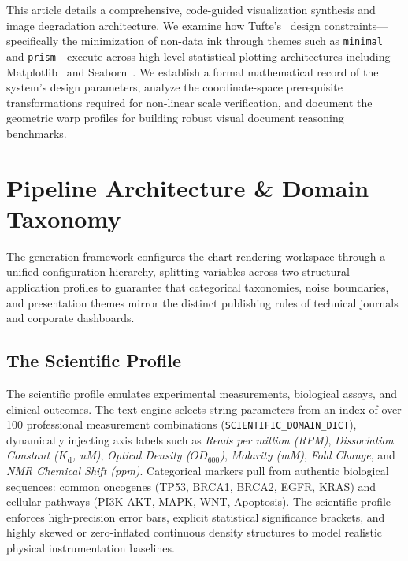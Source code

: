 \documentclass[11pt,twocolumn]{article}
\begin{document}
This article details a comprehensive, code-guided visualization synthesis and image degradation architecture.
We examine how Tufte's~\cite{tufte2001} design constraints---specifically the minimization of non-data ink through themes such as \texttt{minimal} and \texttt{prism}---execute across high-level statistical plotting architectures including Matplotlib~\cite{hunter2007matplotlib} and Seaborn~\cite{waskom2021seaborn}.
We establish a formal mathematical record of the system's design parameters, analyze the coordinate-space prerequisite transformations required for non-linear scale verification, and document the geometric warp profiles for building robust visual document reasoning benchmarks.

\section{Pipeline Architecture \& Domain Taxonomy}\label{sec:architecture}

The generation framework configures the chart rendering workspace through a unified configuration hierarchy, splitting variables across two structural application profiles to guarantee that categorical taxonomies, noise boundaries, and presentation themes mirror the distinct publishing rules of technical journals and corporate dashboards.

\subsection{The Scientific Profile}\label{sec:scientific}

The scientific profile emulates experimental measurements, biological assays, and clinical outcomes.
The text engine selects string parameters from an index of over 100 professional measurement combinations (\texttt{SCIENTIFIC\_DOMAIN\_DICT}), dynamically injecting axis labels such as \emph{Reads per million (RPM)}, \emph{Dissociation Constant ($K_{\text{d}}$, nM)}, \emph{Optical Density ($OD_{600}$)}, \emph{Molarity (mM)}, \emph{Fold Change}, and \emph{NMR Chemical Shift (ppm)}.
Categorical markers pull from authentic biological sequences: common oncogenes (TP53, BRCA1, BRCA2, EGFR, KRAS) and cellular pathways (PI3K-AKT, MAPK, WNT, Apoptosis).
The scientific profile enforces high-precision error bars, explicit statistical significance brackets, and highly skewed or zero-inflated continuous density structures to model realistic physical instrumentation baselines.
\end{document}

